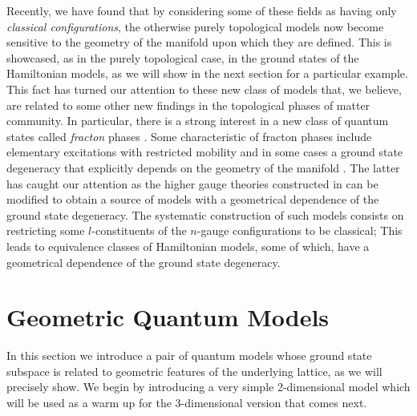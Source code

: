 \documentclass[a4paper,11pt]{article}
\theoremstyle{plain}%
\theoremstyle{definition}
\theoremstyle{remark}
\begin{document}
Recently, we have found that by considering some of these fields as having only \emph{classical configurations}, the otherwise purely topological models now become sensitive to the geometry of the manifold upon which they are defined. This is showcased, as in the purely topological case, in the ground states of the Hamiltonian models, as we will show in the next section for a particular example. This fact has turned our attention to these new class of models that, we believe, are related to some other new findings in the topological phases of matter community. In particular, there is a strong interest in a new class of quantum states called \emph{fracton} phases \cite{Chamon05,Bravyi11,Castelnovo12,Haah11,bravyi13,yoshida13,Vijay15,Vijay16,Vijay17,
Shirley18,Nandkishore18}. Some characteristic of fracton phases include elementary excitations with restricted mobility and in some cases a ground state degeneracy that explicitly depends on the geometry of the manifold \cite{Slagle17}. The latter has caught our attention as the higher gauge theories constructed in \cite{higher} can be modified to obtain a source of models with a geometrical dependence of the ground state degeneracy. The systematic construction of such models consists on restricting some $l$-constituents of the $n$-gauge configurations to be classical; This leads to equivalence classes of Hamiltonian models, some of which, have a geometrical dependence of the ground state degeneracy.  


\section{Geometric Quantum Models}\label{sec:QModels}

In this section we introduce a pair of quantum models whose ground state subspace is related to geometric features of the underlying lattice, as we will precisely show. We begin by introducing a very simple 2-dimensional model which will be used as a warm up for the 3-dimensional version that comes next.
\end{document}
